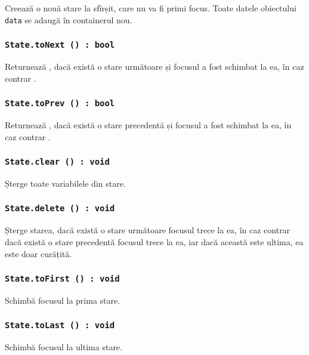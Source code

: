 Creează o nouă stare la sfîrșit, care nu va fi primi focus.  Toate datele obiectului \texttt{data} se adaugă în containerul nou.

\subsubsection{\texttt{State.toNext () : bool}}

Returnează \true, dacă există o stare următoare și focusul a fost schimbat la ea, în caz contrar \false.

\subsubsection{\texttt{State.toPrev () : bool}}

Returnează \true, dacă există o stare precedentă și focusul a fost schimbat la ea, în caz contrar \false.

\subsubsection{\texttt{State.clear () : void}}

Șterge toate variabilele din stare.

\subsubsection{\texttt{State.delete () : void}}

Șterge starea, dacă există o stare următoare focusul trece la ea, în caz contrar dacă există o stare precedentă focusul trece la ea, iar dacă această este ultima, ea este doar curățită.

\subsubsection{\texttt{State.toFirst () : void}}

Schimbă focusul la prima stare.

\subsubsection{\texttt{State.toLast () : void}}

Schimbă focusul la ultima stare.

